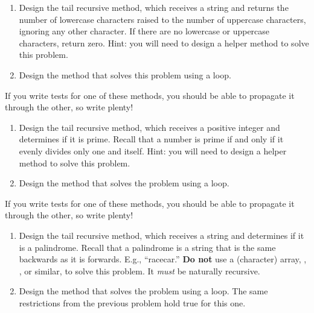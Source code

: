 

\begin{enumerate}[label=(\alph*)]
    \item Design the  tail recursive method, which receives a string and returns the number of lowercase characters raised to the number of uppercase characters, ignoring any other character. If there are no lowercase or uppercase characters, return zero. Hint: you will need to design a  helper method to solve this problem.
    \item Design the  method that solves this problem using a loop.
\end{enumerate}
If you write tests for one of these methods, you should be able to propagate it through the other, so write plenty!

\begin{enumerate}[label=(\alph*)]
    \item Design the  tail recursive method, which receives a positive integer and determines if it is prime. Recall that a number is prime if and only if it evenly divides only one and itself. Hint: you will need to design a  helper method to solve this problem.
    \item Design the  method that solves the problem using a loop.
\end{enumerate}

If you write tests for one of these methods, you should be able to propagate it through the other, so write plenty!

\begin{enumerate}[label=(\alph*)]
    \item Design the  tail recursive method, which receives a string and determines if it is a palindrome. Recall that a palindrome is a string that is the same backwards as it is forwards. E.g., ``racecar.'' \textbf{Do not} use a (character) array, , , or similar, to solve this problem. It \emph{must} be naturally recursive.
    \item Design the  method that solves the problem using a loop. The same restrictions from the previous problem hold true for this one.
\end{enumerate}


